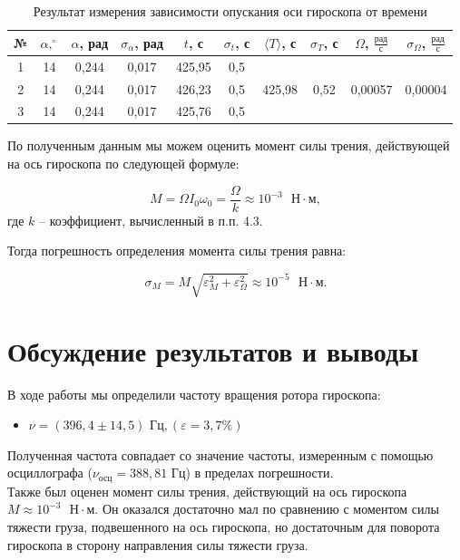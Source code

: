 \documentclass[a4paper,12pt]{article} %
\begin{document}
\begin{table}[H]
	\centering
	\begin{tabular}{|c|c|c|c|c|c|c|c|c|c|}
		\hline
		№ & $ \alpha, ^\circ $ & $ \alpha $, рад & $ \sigma_\alpha $, рад & $ t $, с & $ \sigma_t $, с & $ \langle T \rangle $, с & $ \sigma_T $, с & $ \Omega $, $ \frac{\text{рад}}{\text{с}} $ & $ \sigma_\Omega $,  $ \frac{\text{рад}}{\text{с}}  $ \\ \hline
		1 & 14 & 0,244 & 0,017 & 425,95 & 0,5 & \multirow{3}{*}{425,98} & \multirow{3}{*}{0,52} & \multirow{3}{*}{0,00057} & \multirow{3}{*}{0,00004} \\ \cline{1-6}
		2 & 14 & 0,244 & 0,017 & 426,23 & 0,5 &  &  &  &  \\ \cline{1-6}
		3 & 14 & 0,244 & 0,017 & 425,76 & 0,5 &  &  &  &  \\ \hline
	\end{tabular}
	\caption{Результат измерения зависимости опускания оси гироскопа от времени}
	\label{tab:my-table}
\end{table}

По полученным данным мы можем оценить момент силы трения, действующей на ось гироскопа по следующей формуле:

\begin{equation}
M = \Omega I_0\omega_0 = \frac{\Omega}{k} \approx 10^{-3} \text{ } \text{Н} \cdot \text{м},
\end{equation}
где $ k $ -- коэффициент, вычисленный в п.п. 4.3.

Тогда погрешность определения момента силы трения равна:

\begin{equation}
\sigma_M = M\sqrt{\varepsilon_M^2+\varepsilon_\Omega^2} \approx 10^{-5} \text{ } \text{Н} \cdot \text{м}.
\end{equation}

\section{Обсуждение результатов и выводы}

В ходе работы мы определили частоту вращения ротора гироскопа:

\begin{itemize}
	\item \underline{$ \nu = \left( 396,4 \pm 14,5 \right) \text{ Гц}, \left( \varepsilon = 3,7 \% \right)   $}
\end{itemize}
Полученная частота совпадает со значение частоты, измеренным с помощью осциллографа ($ \nu_\text{осц} = 388,81 $ Гц) в пределах погрешности.\\
Также был оценен момент силы трения, действующий на ось гироскопа $ M \approx 10^{-3} \text{ } \text{Н} \cdot \text{м} $. Он оказался достаточно мал по сравнению с моментом силы тяжести груза, подвешенного на ось гироскопа, но достаточным для поворота гироскопа в сторону направления силы тяжести груза.
\end{document}
